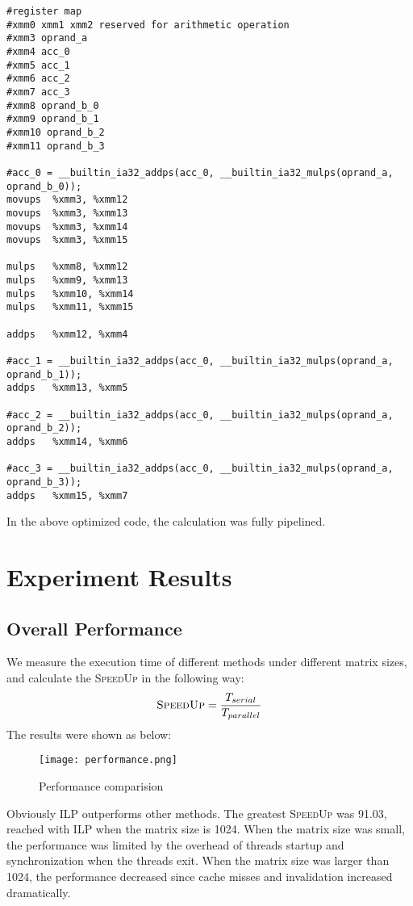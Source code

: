 \documentclass[12pt]{article}
\begin{document}
\scriptsize
\begin{verbatim}
#register map
#xmm0 xmm1 xmm2 reserved for arithmetic operation
#xmm3 oprand_a
#xmm4 acc_0
#xmm5 acc_1
#xmm6 acc_2
#xmm7 acc_3
#xmm8 oprand_b_0
#xmm9 oprand_b_1
#xmm10 oprand_b_2
#xmm11 oprand_b_3

#acc_0 = __builtin_ia32_addps(acc_0, __builtin_ia32_mulps(oprand_a, oprand_b_0));
movups  %xmm3, %xmm12
movups  %xmm3, %xmm13
movups  %xmm3, %xmm14
movups  %xmm3, %xmm15

mulps   %xmm8, %xmm12
mulps   %xmm9, %xmm13
mulps   %xmm10, %xmm14
mulps   %xmm11, %xmm15

addps   %xmm12, %xmm4

#acc_1 = __builtin_ia32_addps(acc_0, __builtin_ia32_mulps(oprand_a, oprand_b_1));
addps   %xmm13, %xmm5

#acc_2 = __builtin_ia32_addps(acc_0, __builtin_ia32_mulps(oprand_a, oprand_b_2));
addps   %xmm14, %xmm6

#acc_3 = __builtin_ia32_addps(acc_0, __builtin_ia32_mulps(oprand_a, oprand_b_3));
addps   %xmm15, %xmm7
\end{verbatim}
\normalsize

In the above optimized code, the calculation was fully pipelined.

\section{Experiment Results}
\subsection{Overall Performance}
We measure the execution time of different methods under different matrix sizes,
and calculate the \textsc{SpeedUp} in the following way:
\begin{equation}
\textsc{SpeedUp} = \frac{T_{serial}}{T_{parallel}}
\end{equation}
The results were shown as below:

\begin{figure}[h!]
	\begin{center}
		\texttt{[image: performance.png]}
		\caption{\label{fig:performance}Performance comparision}
	\end{center}
\end{figure}

Obviously ILP outperforms other methods. The greatest \textsc{SpeedUp} was 91.03,
reached with ILP when the matrix size is 1024. When the matrix size was small, 
the performance was limited by the overhead of threads startup and synchronization
when the threads exit. When the matrix size was larger than 1024, the performance
decreased since cache misses and invalidation increased dramatically.
\end{document}
